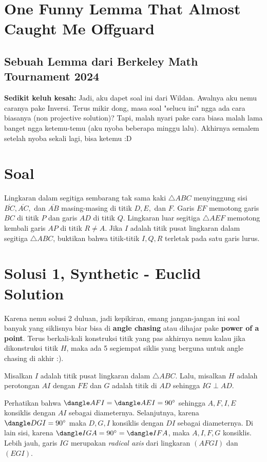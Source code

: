 \section*{One Funny Lemma That Almost Caught Me Offguard}
\subsection*{Sebuah Lemma dari Berkeley Math Tournament 2024}
\textbf{Sedikit keluh kesah:} Jadi, aku dapet soal ini dari Wildan. Awalnya aku nemu caranya pake Inversi. Terus mikir dong, masa soal "selucu ini" ngga ada cara biasanya (non projective solution)? Tapi, malah nyari pake cara biasa malah lama banget ngga ketemu-temu (aku nyoba beberapa minggu lalu). Akhirnya semalem setelah nyoba sekali lagi, bisa ketemu :D

\section{Soal}
Lingkaran dalam segitiga sembarang tak sama kaki $\triangle ABC$ menyinggung sisi $\overline{BC}, \overline{AC},$ dan $\overline{AB}$ masing-masing di titik $D, E,$ dan $F$. Garis $EF$ memotong garis $BC$ di titik $P$ dan garis $AD$ di titik $Q$. Lingkaran luar segitiga $\triangle AEF$ memotong kembali garis $AP$ di titik $R \neq A$. Jika $I$ adalah titik pusat lingkaran dalam segitiga $\triangle ABC$, buktikan bahwa titik-titik $I, Q, R$ terletak pada satu garis lurus.



\newpage
\section{Solusi 1, Synthetic - Euclid Solution}
    \begin{remark*}[Motivasi]
        Karena nemu solusi 2 duluan, jadi kepikiran, emang jangan-jangan ini soal banyak yang siklisnya biar bisa di \textbf{angle chasing} atau dihajar pake \textbf{power of a point}. Terus berkali-kali konstruksi titik yang pas akhirnya nemu kalau jika dikonstruksi titik $H$, maka ada 5 segiempat siklis yang berguna untuk angle chasing di akhir :).
    \end{remark*}
    Misalkan $I$ adalah titik pusat lingkaran dalam $\triangle ABC$. Lalu, misalkan $H$ adalah perotongan $AI$ dengan $FE$ dan $G$ adalah titik di $AD$ sehingga $IG \perp AD$.

    
    
    Perhatikan bahwa $\dangle AFI = \dangle AEI = 90^\circ$ sehingga $A,F,I,E$ konsiklis dengan $AI$ sebagai diameternya. 
    Selanjutnya, karena $\dangle DGI = 90^\circ$ maka $D,G,I$ konsiklis dengan $DI$ sebagai diameternya. Di lain sisi, karena $\dangle IGA = 90^\circ = \dangle IFA$, maka $A,I,F,G$ konsiklis. 
    Lebih jauh, garis $IG$ merupakan \textit{radical axis} dari lingkaran $(AFGI)$ dan $(EGI)$.
    

